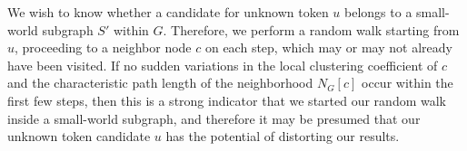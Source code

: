 \documentclass[12pt]{article}
\begin{document}
We wish to know whether a candidate for unknown token $u$ belongs to a small-world subgraph $S'$ within $G$. Therefore, we perform a random walk starting from $u$, proceeding to a neighbor node $c$ on each step, which may or may not already have been visited. If no sudden variations in the local clustering coefficient of $c$ and the characteristic path length of the neighborhood $N_{G}[c]$ occur within the first few steps, then this is a strong indicator that we started our random walk inside a small-world subgraph, and therefore it may be presumed that our unknown token candidate $u$ has the potential of distorting our results.

\renewcommand\refname{References}


\end{document}
